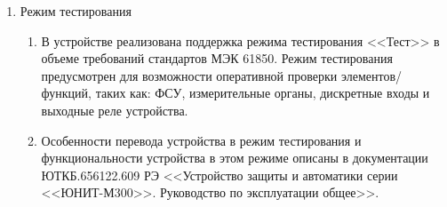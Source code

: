 \begin{enumerate}
\begin{enumerate}
\item
В устройстве реализована функция записи сигналов дискретных входов, работы защит, автоматики и сервисных сигналов в журнал событий. События безопасности записываются в отдельный журнал безопасности. Подробное описание параметров журналов событий приведено в документации ЮТКБ.656122.609 РЭ <<Устройство защиты и автоматики серии <<ЮНИТ-М300>>. Руководство по эксплуатации общее>>.
\item
Максимальное число записей журнала -- 20000. Каждая запись в журнал событий содержит в себе следующую информацию:
\begin{itemize}
\item дату и время возникновения события;
\item идентификатор события;
\item состояние дискретного или значение аналогового сигнала в момент события;
\item качество зарегистрированного параметра;
\item качество времени.
\end{itemize}
\item
Данные о событиях сохраняются в энергонезависимой памяти. При заполнении журнала событий перезапись осуществляется от более старых событий к новым, то есть циклически. Удаление информации из журнала событий пользователем невозможно. Перечень сигналов, доступных для регистрации в журнале событий, приведен в приложении \ref{app:signals}.

\end{enumerate}

\item Режим тестирования
\begin{enumerate}

\item В устройстве реализована поддержка режима тестирования <<Тест>> в объеме требований стандартов МЭК 61850. Режим тестирования предусмотрен для возможности оперативной проверки элементов/функций, таких как: ФСУ, измерительные органы, дискретные входы и выходные реле устройства.

\item  Особенности перевода устройства в режим тестирования и функциональности устройства в этом режиме описаны в документации ЮТКБ.656122.609 РЭ <<Устройство защиты и автоматики серии <<ЮНИТ-М300>>. Руководство по эксплуатации общее>>.


\end{enumerate}
\end{enumerate}
